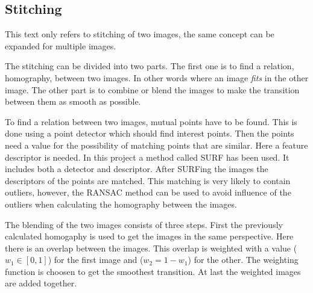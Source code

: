 \subsection{Stitching}
This text only refers to stitching of two images, the same concept can be expanded for multiple images.

The stitching can be divided into two parts.
The first one is to find a relation, homography, between two images.
In other words where an image {\it fits} in the other image.
The other part is to combine or blend the images to make the transition between them as smooth as possible.

To find a relation between two images, mutual points have to be found.
This is done using a point detector which should find interest points.
Then the points need a value for the possibility of matching points that are similar.
Here a feature descriptor is needed.
In this project a method called SURF has been used.
It includes both a detector and descriptor.
After SURFing the images the descriptors of the points are matched.
This matching is very likely to contain outliers, however, the RANSAC method can be used to avoid influence of the outliers when calculating the homography between the images.

The blending of the two images consists of three steps.
First the previously calculated homogaphy is used to get the images in the same perspective.
Here there is an overlap between the images.
This overlap is weighted with a value ($w_1 \in [0, 1]$) for the first image and ($w_2 = 1 - w_1$) for the other.
The weighting function is choosen to get the smoothest transition.
At last the weighted images are added together.
